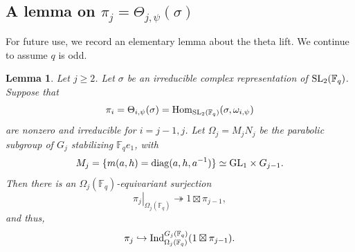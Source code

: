 \documentclass[12pt]{amsart}
\newtheorem{lemma}[theorem]{Lemma}%
\theoremstyle{definition}
\theoremstyle{remark}
\begin{document}
\subsection{A lemma on $\pi_j=\Theta_{j,\psi}(\sigma)$}\label{section-future} 

For future use, we record an elementary lemma about the theta lift. We continue to assume $q$ is odd.

\begin{lemma}\label{lemma-gt-finite}
Let $j \geq 2$. 
Let $\sigma$ be an irreducible complex representation of ${\rm SL}_2(\mathbb F_q)$. Suppose that
\[
\pi_i=\Theta_{i,\psi}(\sigma)
={\rm Hom}_{{\rm SL}_2(\mathbb F_q)}
(\sigma,\omega_{i,\psi})
\]
are nonzero and irreducible for $i=j-1,j$. Let $\Omega_j=M_jN_j$ be the parabolic subgroup of $G_j$ stabilizing $\mathbb F_qe_1$, with
\[
M_j=\{m(a,h)={\rm diag}(a,h,a^{-1})\}
\simeq {\rm GL}_1\times G_{j-1}.
\]
Then there is an $\Omega_j(\mathbb F_q)$-equivariant surjection
\[
\left.\pi_j\right|_{\Omega_j(\mathbb F_q)}
\twoheadrightarrow 1\boxtimes\pi_{j-1},
\]
and thus,
\[
\pi_j\hookrightarrow
{\rm Ind}_{\Omega_j(\mathbb F_q)}^{G_j(\mathbb F_q)}
(1\boxtimes\pi_{j-1}).
\]
\end{lemma}
\end{document}
